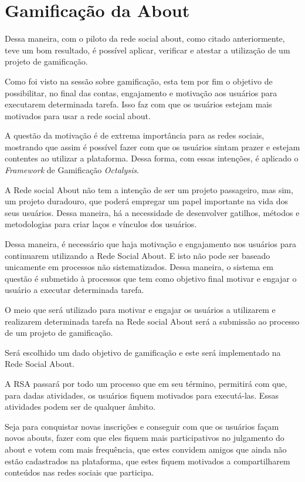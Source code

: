 \section{Gamificação da About}
\label{sub:gamifição}
Dessa maneira, com o piloto da rede social about, como citado anteriormente, teve um bom resultado, 
é possível aplicar, verificar e
atestar a utilização de um projeto de gamificação.

Como foi visto na sessão sobre gamificação, esta tem por fim o objetivo de 
possibilitar, no final das contas, engajamento e motivação aos usuários para
executarem determinada tarefa. Isso faz com que os usuários estejam mais
motivados para usar a rede social about. 

A questão da motivação é de extrema importância para as redes sociais, mostrando
que assim é possível fazer com que os usuários sintam prazer e estejam
contentes ao utilizar a plataforma. Dessa forma, com essas intenções,
é aplicado o \textit{Framework} de Gamificação \textit{Octalysis}.

A Rede social About não tem a intenção de ser um projeto passageiro, mas sim,
um projeto duradouro, que poderá empregar um papel importante na vida dos
seus usuários. Dessa maneira, há a necessidade de desenvolver gatilhos, métodos
e metodologias para criar laços e vínculos dos usuários.

Dessa maneira, é necessário que haja motivação e engajamento nos usuários para 
continuarem utilizando a Rede Social About. E isto não pode ser baseado unicamente
em processos não sistematizados. Dessa maneira, o sistema em questão é 
submetido à processos que tem como objetivo final motivar e engajar o usuário
a executar determinada tarefa.

O meio que será utilizado para motivar e engajar os usuários a utilizarem e
realizarem determinada tarefa na Rede social About será a submissão ao processo
de um projeto de gamificação. 

Será escolhido um dado objetivo de gamificação e este será implementado na Rede
Social About.

A RSA passará por todo um processo que em seu término, permitirá com que,
para dadas atividades, os usuários fiquem motivados para executá-las. Essas
atividades podem ser de qualquer âmbito. 

Seja para conquistar novas inscrições e
conseguir com que os usuários façam novos abouts, fazer com que eles fiquem mais
participativos no julgamento do about e votem com mais frequência, que estes
convidem amigos que ainda não estão cadastrados na plataforma, que estes fiquem
motivados a compartilharem conteúdos nas redes sociais que participa.

